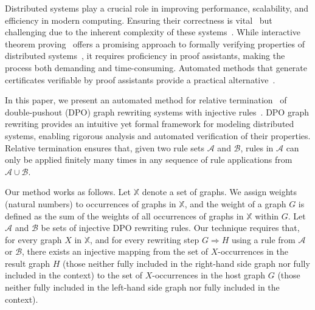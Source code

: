 Distributed systems play a crucial role in improving performance, 
scalability, and efficiency in modern computing. Ensuring their correctness is vital~\cite{heiser2010theroad} but challenging due to the inherent complexity of these systems~\cite{lamport2019thebyzantine}.
While interactive theorem proving~\cite{harrison2014history} offers a promising approach to formally verifying properties of distributed systems~\cite{plump2024formalisingDPO,potop2019formal,courtieu2016certified},  
it requires proficiency in proof assistants, making the process both demanding and time-consuming. Automated methods that generate certificates verifiable by proof assistants provide a practical alternative~\cite{contejean2011automated,giesl2014proving}.  
  
In this paper, we present an automated method for relative termination~\cite{geser1990relative} of double-pushout (DPO) graph rewriting systems with injective rules~\cite{corradini1997algebraic,habel2001double,konig2018atutorial}.
DPO graph rewriting provides an intuitive yet formal framework for modeling distributed systems, enabling rigorous analysis and automated verification of  their properties.
Relative termination ensures that, given two rule sets \( \mathcal{A} \) and \( \mathcal{B} \), rules in $\mathcal{A}$ can only be applied finitely many times in any sequence of rule applications from $\mathcal{A} \cup \mathcal{B}$.

Our method works as follows. Let \( \mathbb{X} \) denote a set of graphs. We assign weights (natural numbers) to occurrences of graphs in \( \mathbb{X} \), and the weight of a graph $G$ is defined as the sum of the weights of all occurrences of graphs in \( \mathbb{X} \) within $G$. Let $\mathcal{A}$ and $\mathcal{B}$ be sets of injective DPO rewriting rules. Our technique requires that, for every graph $X$ in $\mathbb{X}$, and for every rewriting step $G \Rightarrow H$ using a rule from $\mathcal{A}$ or $\mathcal{B}$, there exists an injective mapping from the set of \( X \)-occurrences in the result graph $H$
(those neither fully included in the right-hand side graph nor fully included in the context)
 to the set of \( X \)-occurrences in the host graph $G$ (those neither fully included in the left-hand side graph nor fully included in the context).   


